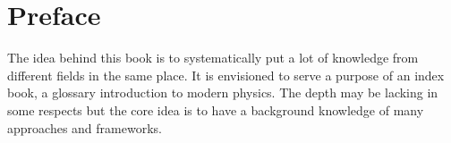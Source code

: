 \chapter*{Preface}
The idea behind this book is to systematically put a lot of knowledge from different fields in the same place. It is envisioned to serve a purpose of an index book, a glossary introduction to modern physics. The depth may be lacking in some respects but the core idea is to have a background knowledge of many approaches and frameworks.


